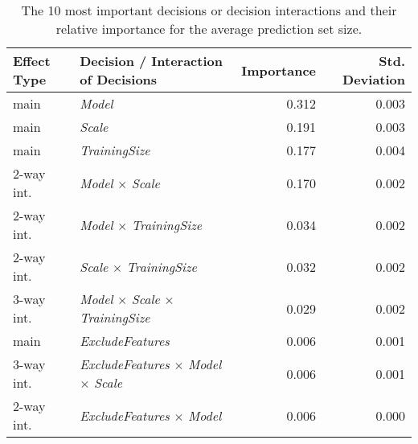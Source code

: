 \begin{table}
\centering
\caption{The 10 most important decisions or decision interactions and their relative importance for the average prediction set size.}
\label{tab:fanova_top10}
\begin{tabular}{llrr}
\toprule
Effect Type &                                      Decision / Interaction of Decisions &  Importance &  Std. Deviation \\
\midrule
       main &                                                           \textit{Model} &       0.312 &           0.003 \\
       main &                                                           \textit{Scale} &       0.191 &           0.003 \\
       main &                                                    \textit{TrainingSize} &       0.177 &           0.004 \\
 2-way int. &                                   \textit{Model} $\times$ \textit{Scale} &       0.170 &           0.002 \\
 2-way int. &                            \textit{Model} $\times$ \textit{TrainingSize} &       0.034 &           0.002 \\
 2-way int. &                            \textit{Scale} $\times$ \textit{TrainingSize} &       0.032 &           0.002 \\
 3-way int. &    \textit{Model} $\times$ \textit{Scale} $\times$ \textit{TrainingSize} &       0.029 &           0.002 \\
       main &                                                 \textit{ExcludeFeatures} &       0.006 &           0.001 \\
 3-way int. & \textit{ExcludeFeatures} $\times$ \textit{Model} $\times$ \textit{Scale} &       0.006 &           0.001 \\
 2-way int. &                         \textit{ExcludeFeatures} $\times$ \textit{Model} &       0.006 &           0.000 \\
\bottomrule
\end{tabular}
\end{table}
